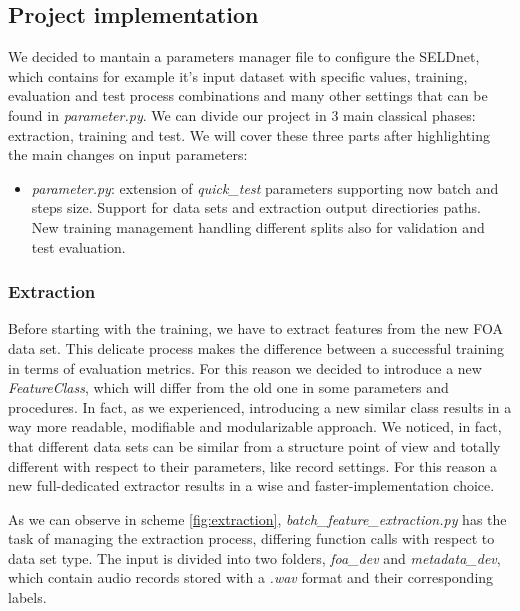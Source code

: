 \documentclass[11pt]{article}
\begin{document}
\subsection{Project implementation}
We decided to mantain a parameters manager file to configure the SELDnet, which contains for example it's input dataset with specific values, training, evaluation and test process combinations and many other settings that can be found in \textit{parameter.py}. We can divide our project in 3 main classical phases: extraction, training and test. We will cover these three parts after highlighting the main changes on input parameters:

\begin{itemize}
\item \textit{parameter.py}: extension of \textit{quick\_test} parameters supporting now batch and steps size. Support for data sets and extraction output directiories paths. New training management handling different splits also for validation and test evaluation.
\end{itemize}

\subsubsection{Extraction}

Before starting with the training, we have to extract features from the new FOA data set. This delicate process makes the difference between a successful training in terms of evaluation metrics. For this reason we decided to introduce a new \textit{FeatureClass}, which will differ from the old one in some parameters and procedures. In fact, as we experienced, introducing a new similar class results in a way more readable, modifiable and modularizable approach. We noticed, in fact, that different data sets can be similar from a structure point of view and totally different with respect to their parameters, like record settings. For this reason a new full-dedicated extractor results in a wise and faster-implementation choice.

\noindent
As we can observe in scheme \ref{fig:extraction}, \textit{batch\_feature\_extraction.py} has the task of managing the extraction process, differing function calls with respect to data set type. The input is divided into two folders, \textit{foa\_dev} and \textit{metadata\_dev}, which contain audio records stored with a \textit{.wav} format and their corresponding labels.
\end{document}
